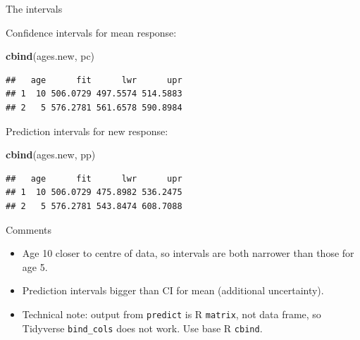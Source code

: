 \documentclass[ignorenonframetext,]{beamer}
\newenvironment{Shaded}{\begin{snugshade}}{\end{snugshade}}
\newcommand{\KeywordTok}[1]{\textcolor[rgb]{0.13,0.29,0.53}{\textbf{#1}}}
\newcommand{\NormalTok}[1]{#1}
\begin{document}
\begin{frame}[fragile]{The intervals}
\protect\hypertarget{the-intervals}{}

Confidence intervals for mean response:

\begin{Shaded}
\begin{Highlighting}[]
\KeywordTok{cbind}\NormalTok{(ages.new, pc)}
\end{Highlighting}
\end{Shaded}

\begin{verbatim}
##   age      fit      lwr      upr
## 1  10 506.0729 497.5574 514.5883
## 2   5 576.2781 561.6578 590.8984
\end{verbatim}

Prediction intervals for new response:

\begin{Shaded}
\begin{Highlighting}[]
\KeywordTok{cbind}\NormalTok{(ages.new, pp)}
\end{Highlighting}
\end{Shaded}

\begin{verbatim}
##   age      fit      lwr      upr
## 1  10 506.0729 475.8982 536.2475
## 2   5 576.2781 543.8474 608.7088
\end{verbatim}

\end{frame}

\begin{frame}[fragile]{Comments}
\protect\hypertarget{comments-1}{}

\begin{itemize}
\item
  Age 10 closer to centre of data, so intervals are both narrower than
  those for age 5.
\item
  Prediction intervals bigger than CI for mean (additional uncertainty).
\item
  Technical note: output from \texttt{predict} is R \texttt{matrix}, not
  data frame, so Tidyverse \texttt{bind\_cols} does not work. Use base R
  \texttt{cbind}.
\end{itemize}

\end{frame}
\end{document}
